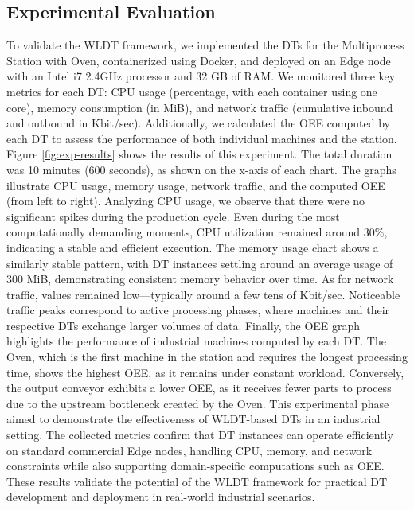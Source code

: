 
\subsection{Experimental Evaluation}
\label{ssec:masa_exp_evaluation}

To validate the WLDT framework, we implemented the DTs for the Multiprocess Station with Oven, containerized using Docker, and deployed on an Edge node with an Intel i7 2.4GHz processor and 32 GB of RAM. We monitored three key metrics for each DT: CPU usage (percentage, with each container using one core), memory consumption (in MiB), and network traffic (cumulative inbound and outbound in Kbit/sec).
Additionally, we calculated the OEE computed by each DT to assess the performance of both individual machines and the station. Figure \ref{fig:exp-results} shows the results of this experiment. The total duration was 10 minutes (600 seconds), as shown on the x-axis of each chart. The graphs illustrate CPU usage, memory usage, network traffic, and the computed OEE (from left to right). Analyzing CPU usage, we observe that there were no significant spikes during the production cycle. Even during the most computationally demanding moments, CPU utilization remained around 30\%, indicating a stable and efficient execution.
The memory usage chart shows a similarly stable pattern, with DT instances settling around an average usage of 300 MiB, demonstrating consistent memory behavior over time.
As for network traffic, values remained low—typically around a few tens of Kbit/sec.
Noticeable traffic peaks correspond to active processing phases, where machines and their respective DTs exchange larger volumes of data.
Finally, the OEE graph highlights the performance of industrial machines computed by each DT. The Oven, which is the first machine in the station and requires the longest processing time, shows the highest OEE, as it remains under constant workload.
Conversely, the output conveyor exhibits a lower OEE, as it receives fewer parts to process due to the upstream bottleneck created by the Oven. This experimental phase aimed to demonstrate the effectiveness of WLDT-based DTs in an industrial setting.
The collected metrics confirm that DT instances can operate efficiently on standard commercial Edge nodes, handling CPU, memory, and network constraints while also supporting domain-specific computations such as OEE. These results validate the potential of the WLDT framework for practical DT development and deployment in real-world industrial scenarios.